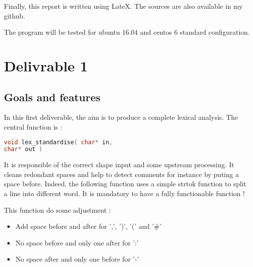 \documentclass[twoside,twocolumn]{article}
\begin{document}
Finally, this report is written using LateX. The sources are also available in my github.

The program will be tested for ubuntu 16.04 and centos 6 standard configuration.

% 
% 
% 


\section{Delivrable 1}

\subsection{Goals and features}
In this first deliverable, the aim is to produce a complete lexical analysis. The central function is :

\begin{lstlisting}[language=C]
void lex_standardise( char* in, 
char* out )
\end{lstlisting}

It is responsible of the correct shape input and some upstream processing. It cleans redondant spaces and help to detect comments for instance by puting a space before. Indeed, the following function uses a simple strtok function to split a line into different word. It is mandatory to have a fully functionable function !

This function do some adjustment :

\begin{itemize}
 \item Add space before and after for ',', ')', '(' and '\#'
 \item No space before and only one after for ':'
 \item No space after and only one before for '-'
\end{itemize}
\end{document}
